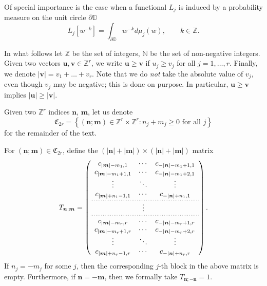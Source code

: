\documentclass[reqno,centertags,11pt,draft]{amsart}
\newcommand{\Z}{\mathbb{Z}}
\newcommand{\N}{\mathbb{N}}
\newcommand{\T}{\mathbb{\partial\mathbb{D}}}
\newcommand{\abs}[1]{\left|#1\right|}
\begin{document}
Of special importance is the case when a functional $L_j$ is induced by a probability measure on the unit circle $\T$
\begin{equation}\label{eq:functionals given by measures}
        L_j[w^{-k}] = \int_{\T} w^{-k} d\mu_j(w), \qquad 
        k \in \Z. %
\end{equation}

In what follows let $\Z$ be the set of integers, $\N$ be the set of non-negative integers. Given two vectors $\bm{u},\bm{v}\in \Z^r$, we write $\bm{u}\ge \bm{v}$ if $u_j\ge v_j$ for all $j=1,\ldots,r$.
Finally, we denote $|\bm{v}| = v_1+\ldots + v_r$. Note that we do {\it not} take the absolute value of $v_j$, even though $v_j$ may be negative; this is done on purpose. In particular, $\bm{u}\ge \bm{v}$ implies $|\bm{u}|\ge |\bm{v}|$.

Given two $\Z^r$ indices $\bm{n}$, $\bm{m}$, let us denote 
\begin{equation}
     \mathfrak{C}_{2r}
     =
     \left\{
     (\bm{n};\bm{m}) \in\Z^r\times\Z^r : 
     n_j+m_j\ge 0 \mbox{ for all } j
     \right\}
\end{equation}
for the remainder of the text.
    
For $(\bm{n};\bm{m})\in\mathfrak{C}_{2r}$, define the $(|\bm{n}|+|\bm{m}|)\times (|\bm{n}|+|\bm{m}|)$ matrix
\begin{equation}\label{eq:T}
    T_{\bm{n};\bm{m}} =\left( \begin{array}{ccc}
        c_{\abs{\bm{m}}-m_1,1} & \cdots & c_{-\abs{\bm{n}}-m_1+1,1} \\
        c_{\abs{\bm{m}}-m_1+1,1} & \cdots & c_{-\abs{\bm{n}}-m_1+2,1} \\
        \vdots & \ddots & \vdots \\
        c_{\abs{\bm{m}}+n_1-1,1} & \cdots & c_{-\abs{\bm{n}}+n_1,1} 
        \\[0.2em]
        \hdashline[0.5pt/2pt]
        \\[-1.2em]
        & \vdots \\[0.2em]
        \hdashline[0.5pt/2pt]
        \\[-1.0em]
        c_{\abs{\bm{m}}-m_r,r} & \cdots & c_{-\abs{\bm{n}}-m_r+1,r} \\
        c_{\abs{\bm{m}}-m_r+1,r} & \cdots & c_{-\abs{\bm{n}}-m_r+2,r} \\
        \vdots & \ddots & \vdots \\
        c_{\abs{\bm{m}}+n_r-1,r} & \cdots & c_{-\abs{\bm{n}}+n_r,r}
    \end{array}\right). 
\end{equation}
If $n_j=-m_j$ for some $j$, then the corresponding $j$-th block in the above matrix is empty. Furthermore, if $\bm{n}=-\bm{m}$, then we formally take $T_{\bm{n};-\bm{n}} = 1$.
\end{document}
